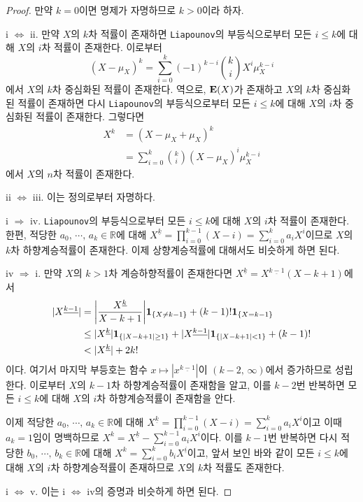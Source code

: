 \begin{proof}
    만약 $k=0$이면 명제가 자명하므로 $k>0$이라 하자.

    i $\Leftrightarrow$ ii. 만약 $X$의 $k$차 적률이 존재하면 \texttt{Liapounov}의 부등식으로부터 모든 $i\leq k$에 대해 $X$의 $i$차 적률이 존재한다. 이로부터
    \begin{equation*}
        (X-\mu_X)^k=\sum_{i=0}^k(-1)^{k-i}\binom{k}{i}X^i\mu_X^{k-i}
    \end{equation*}
    에서 $X$의 $k$차 중심화된 적률이 존재한다. 역으로, $\mathbf{E}(X)$가 존재하고 $X$의 $k$차 중심화된 적률이 존재하면 다시 \texttt{Liapounov}의 부등식으로부터 모든 $i\leq k$에 대해 $X$의 $i$차 중심화된 적률이 존재한다. 그렇다면
    \begin{align*}
        X^k&=(X-\mu_X+\mu_X)^k\\
        &=\sum_{i=0}^k\binom{k}{i}(X-\mu_X)^i\mu_X^{k-i}
    \end{align*}
    에서 $X$의 $n$차 적률이 존재한다.

    ii $\Leftrightarrow$ iii. 이는 정의로부터 자명하다.

    i $\Rightarrow$ iv. \texttt{Liapounov}의 부등식으로부터 모든 $i\leq k$에 대해 $X$의 $i$차 적률이 존재한다. 한편, 적당한 $a_0,\,\cdots,\,a_k\in\mathbb{R}$에 대해 $X^{\underline{k}}=\prod_{i=0}^{k-1}(X-i)=\sum_{i=0}^ka_iX^i$이므로 $X$의 $k$차 하향계승적률이 존재한다. 이제 상향계승적률에 대해서도 비슷하게 하면 된다.

    iv $\Rightarrow$ i. 만약 $X$의 $k>1$차 계승하향적률이 존재한다면 $X^{\underline{k}}=X^{\underline{k-1}}(X-k+1)$에서
    \begin{align*}
        |X^{\underline{k-1}}|&=\bigg|\frac{X^{\underline{k}}}{X-k+1}\bigg|\ind_{\{X\ne k-1\}}+(k-1)!\ind_{\{X=k-1\}}\\
        &\leq|X^{\underline{k}}|\ind_{\{|X-k+1|\geq1\}}+|X^{\underline{k-1}}|\ind_{\{|X-k+1|<1\}}+(k-1)!\\
        &<|X^{\underline{k}}|+2k!
    \end{align*}
    이다. 여기서 마지막 부등호는 함수 $x\mapsto|x^{\underline{k-1}}|$이 $(k-2,\,\infty)$에서 증가하므로 성립한다. 이로부터 $X$의 $k-1$차 하향계승적률이 존재함을 알고, 이를 $k-2$번 반복하면 모든 $i\leq k$에 대해 $X$의 $i$차 하향계승적률이 존재함을 안다.

    이제 적당한 $a_0,\,\cdots,\,a_k\in\mathbb{R}$에 대해 $X^{\underline{k}}=\prod_{i=0}^{k-1}(X-i)=\sum_{i=0}^ka_iX^i$이고 이때 $a_k=1$임이 명백하므로 $X^k=X^{\underline{k}}-\sum_{i=0}^{k-1}a_iX^i$이다. 이를 $k-1$번 반복하면 다시 적당한 $b_0,\,\cdots,\,b_k\in\mathbb{R}$에 대해 $X^k=\sum_{i=0}^kb_iX^{\underline{i}}$이고, 앞서 보인 바와 같이 모든 $i\leq k$에 대해 $X$의 $i$차 하향계승적률이 존재하므로 $X$의 $k$차 적률도 존재한다.

    i $\Leftrightarrow$ v. 이는 i $\Leftrightarrow$ iv의 증명과 비슷하게 하면 된다.
\end{proof}

